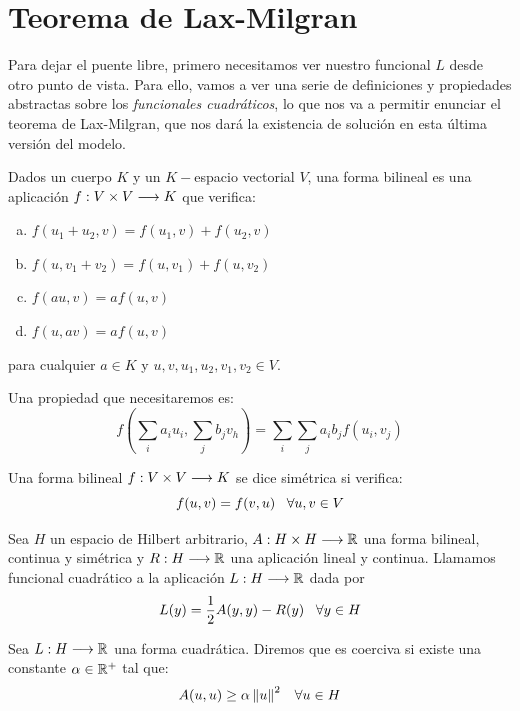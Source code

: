 \chapter{Teorema de Lax-Milgran}

Para dejar el puente libre, primero necesitamos ver nuestro funcional $L$ desde otro punto de vista. Para ello, vamos a ver una serie de definiciones y propiedades abstractas sobre los \textit{funcionales cuadráticos}, lo que nos va a permitir enunciar el teorema de Lax-Milgran, que nos dará la existencia de solución en esta última versión del modelo.

\begin{definition}\label{formabilineal}
Dados un cuerpo $K$ y un $K-$espacio vectorial $V$, una forma bilineal es una aplicación $f : V\times V \longrightarrow K$ que verifica:
\begin{enumerate}[(a)]
\item $f(u_1+u_2,v)=f(u_1,v)+f(u_2,v)$
\item $f(u, v_1+v_2)=f(u,v_1)+f(u,v_2)$
\item $f(au,v)=af(u,v)$
\item $f(u,av)=af(u,v)$
\end{enumerate}
para cualquier $a\in K$ y $u,v,u_1,u_2,v_1,v_2\in V$.

Una propiedad que necesitaremos es:
\[
f\left(\sum_ia_iu_i,\sum_jb_jv_h\right)=\sum_i\sum_ja_ib_jf(u_i,v_j)
\]

\end{definition}

\begin{definition}
Una forma bilineal $f : V\times V \longrightarrow K$ se dice simétrica si verifica:
\[
f(u,v)=f(v,u) \;\;\; \forall u,v\in V
\]
\end{definition}

\begin{definition}
Sea $H$ un espacio de Hilbert arbitrario, $A : H\times H \longrightarrow \mathbb{R}$ una forma bilineal, continua y simétrica y $R : H \longrightarrow \mathbb{R}$ una aplicación lineal y continua. Llamamos funcional cuadrático a la aplicación $L : H \longrightarrow \mathbb{R}$ dada por
\[
L(y)=\frac{1}{2}A(y,y)-R(y) \;\;\;\forall y\in H
\]
\end{definition}

\begin{definition}
Sea $L : H \longrightarrow \mathbb{R}$ una forma cuadrática. Diremos que es coerciva si existe una constante $\alpha\in\mathbb{R}^+$ tal que:
\[
A(u,u)\geq \alpha\left\lVert u\right\rVert^2 \;\;\; \forall u\in H
\]
\end{definition}

